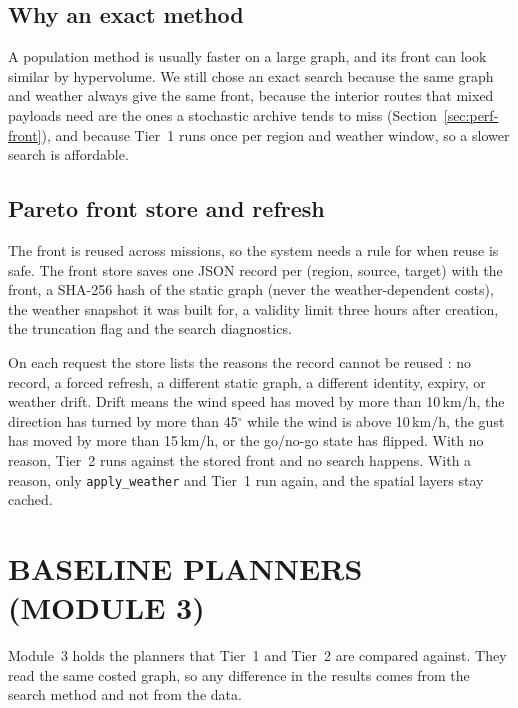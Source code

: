 \subsection{Why an exact method}

A population method is usually faster on a large graph, and its front can look similar
by hypervolume. We still chose an exact search because the same graph and weather always
give the same front, because the interior routes that mixed payloads need are the
ones a stochastic archive tends to miss (Section~\ref{sec:perf-front}), and because
Tier~1 runs once per region and weather window, so a slower search is affordable.

\subsection{Pareto front store and refresh}

The front is reused across missions, so the system needs a rule for when reuse is safe.
The front store saves one JSON record per (region, source, target) with the front, a
SHA-256 hash of the static graph (never the weather-dependent costs), the weather
snapshot it was built for, a validity limit three hours after creation, the truncation
flag and the search diagnostics.

On each request the store lists the reasons the record cannot be reused
: no record, a forced refresh, a different static graph, a
different identity, expiry, or weather drift. Drift means the wind speed has moved by
more than 10\,km/h, the direction has turned by more than 45$^\circ$ while the wind is
above 10\,km/h, the gust has moved by more than 15\,km/h, or the go/no-go state has
flipped. With no reason, Tier~2 runs against the stored front and no search happens.
With a reason, only \texttt{apply\_weather} and Tier~1 run again, and the spatial layers
stay cached.

\section{BASELINE PLANNERS (MODULE 3)}\label{sec:m3}

Module~3 holds the planners that Tier~1 and Tier~2 are compared against. They read the
same costed graph, so any difference in the results comes from the search method and
not from the data.

